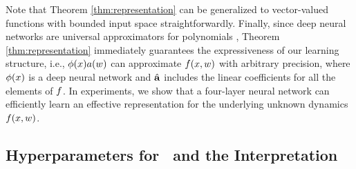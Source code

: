 Note that Theorem \ref{thm:representation} can be generalized to vector-valued functions with bounded input space straightforwardly. Finally, since deep neural networks are universal approximators for polynomials \cite{yarotsky2017error}, Theorem \ref{thm:representation} immediately guarantees the expressiveness of our learning structure, i.e., $\phi( x) a( w)$ can approximate $ f( x, w)$ with arbitrary precision, where $\phi( x)$ is a deep neural network and $\hat{\mathbf{a}}$ includes the linear coefficients for all the elements of $ f$. In experiments, we show that a four-layer neural network can efficiently learn an effective representation for the underlying unknown dynamics $ f( x, w)$.

\subsection{Hyperparameters for \DAML~and the Interpretation}
\label{sec:supp-learning-hyperparameters}

